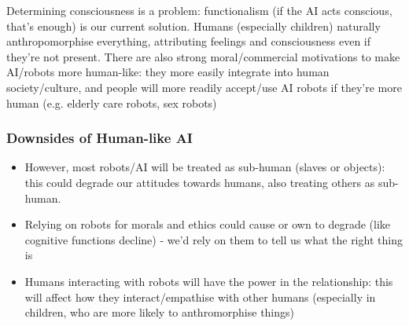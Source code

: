Determining consciousness is a problem: functionalism (if the AI acts conscious, that's enough) is our current solution. Humans (especially children) naturally anthropomorphise everything, attributing feelings and consciousness even if they're not present. There are also strong moral/commercial motivations to make AI/robots more human-like: they more easily integrate into human society/culture, and people will more readily accept/use AI robots if they're more human (e.g. elderly care robots, sex robots)\\

\subsubsection{Downsides of Human-like AI}
\begin{itemize}
    \item However, most robots/AI will be treated as sub-human (slaves or objects): this could degrade our attitudes towards humans, also treating others as sub-human.
    \item Relying on robots for morals and ethics could cause or own to degrade (like cognitive functions decline) - we'd rely on them to tell us what the right thing is
    \item Humans interacting with robots will have the power in the relationship: this will affect how they interact/empathise with other humans (especially in children, who are more likely to anthromorphise things)
\end{itemize} 